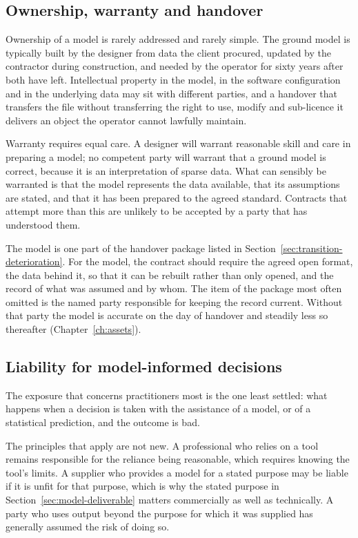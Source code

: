 \subsection{Ownership, warranty and handover}
\label{sec:model-ownership}

Ownership of a model is rarely addressed and rarely simple. The ground model
is typically built by the designer from data the client procured, updated by
the contractor during construction, and needed by the operator for sixty years
after both have left. Intellectual property in the model, in the software
configuration and in the underlying data may sit with different parties, and a
handover that transfers the file without transferring the right to use, modify
and sub-licence it delivers an object the operator cannot lawfully maintain.

Warranty requires equal care. A designer will warrant reasonable skill and
care in preparing a model; no competent party will warrant that a ground model
is correct, because it is an interpretation of sparse data. What can sensibly
be warranted is that the model represents the data
available, that its assumptions are stated, and that it has been prepared to
the agreed standard. Contracts that attempt more than this are unlikely to be
accepted by a party that has understood them.

The model is one part of the handover package listed in
Section~\ref{sec:transition-deterioration}. For the model, the contract should
require the agreed open format, the data behind it, so that it can be rebuilt
rather than only opened, and the record of what was assumed and by whom. The
item of the package most often omitted is the named party responsible for
keeping the record current.
Without that party the model is accurate on the day of handover and steadily less
so thereafter
(Chapter~\ref{ch:assets}).

\subsection{Liability for model-informed decisions}
\label{sec:model-liability}

The exposure that concerns practitioners most is the one least settled: what
happens when a decision is taken with the assistance of a model, or of a
statistical prediction, and the outcome is bad.

The principles that apply are not new. A professional who relies on a tool
remains responsible for the reliance being reasonable, which requires knowing
the tool's limits. A supplier who provides a model for a stated purpose may be
liable if it is unfit for that purpose, which is why the stated purpose in
Section~\ref{sec:model-deliverable} matters commercially as well as
technically. A party who uses output beyond the purpose for which it was
supplied has generally assumed the risk of doing so.

